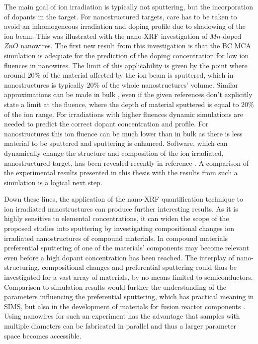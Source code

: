The main goal of ion irradiation is typically not sputtering, but the incorporation of dopants in the target. For nanostructured targets, care has to be taken to avoid an inhomogeneous irradiation and doping profile due to shadowing of the ion beam. This was illustrated with the nano-XRF investigation of $Mn$-doped $ZnO$ nanowires. The first new result from this investigation is that the BC MCA simulation is adequate for the prediction of the doping concentration for low ion fluences in nanowires. The limit of this applicability is given by the point where around $20\%$ of the material affected by the ion beam is sputtered, which in nanostructures is typically $20\%$ of the whole nanostructures' volume. Similar approximations can be made in bulk \cite{moller_tridyn_1984,andersen_computer_1986,moller_tridyn-binary_1988,sigmund_alloy_1993,zaporozchenko_preferential_1995}, even if the given references don't explicitly state a limit at the fluence, where the depth of material sputtered is equal to $20\%$ of the ion range. For irradiations with higher fluences dynamic simulations are needed to predict the correct dopant concentration and profile. For nanostructures this ion fluence can be much lower than in bulk as there is less material to be sputtered and sputtering is enhanced. Software, which can dynamically change the structure and composition of the ion irradiated, nanostructured target, has been revealed recently in reference \cite{moller_tri3dyn_2014}. A comparison of the experimental results presented in this thesis with the results from such a simulation is a logical next step.

Down these lines, the application of the nano-XRF quantification technique to ion irradiated nanostructures can produce further interesting results. As it is highly sensitive to elemental concentrations, it can widen the scope of the proposed studies into sputtering by investigating compositional changes ion irradiated nanostructures of compound materials. In compound materials preferential sputtering of one of the materials' components may become relevant even before a high dopant concentration has been reached. The interplay of nano-structuring, compositional changes and preferential sputtering could thus be investigated for a vast array of materials, by no means limited to semiconductors. Comparison to simulation results would further the understanding of the parameters influencing the preferential sputtering, which has practical meaning in SIMS, but also in the development of materials for fusion reactor components \cite{kelly_attempt_1978,roth_sputtering_1990,kenmotsu_effect_2011}. Using nanowires for such an experiment has the advantage that samples with multiple diameters can be fabricated in parallel and thus a larger parameter space becomes accessible.


